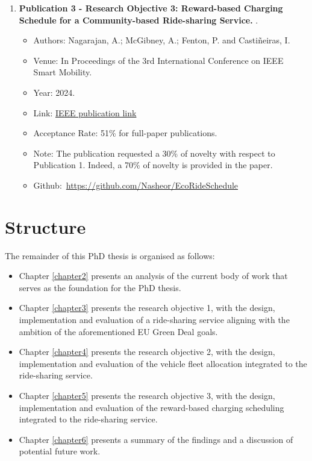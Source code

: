 \begin{enumerate}
    \item \textbf{Publication 3 - Research Objective 3:
    Reward-based Charging Schedule for a Community-based Ride-sharing Service.} \cite{rewardcharging}.
         \begin{itemize}
             \item Authors: Nagarajan, A.; McGibney, A.; Fenton, P. and Castiñeiras, I.
             \item Venue: In Proceedings of the 3rd International Conference on IEEE Smart Mobility.
             \item Year: 2024.
             \item Link: \href{https://ieeexplore.ieee.org/document/10733393}{IEEE publication link}
             \item Acceptance Rate: 51\% for full-paper publications.
             \item Note: The publication requested a 30\% of novelty with respect to Publication 1. Indeed, a 70\% of novelty is provided in the paper.
             \item Github:\ \url{https://github.com/Nasheor/EcoRideSchedule}   
         \end{itemize}
\end{enumerate} 

\section{Structure}
\label{structure}
The remainder of this PhD thesis is organised as follows:
\begin{itemize}
    \item Chapter \ref{chapter2} presents an analysis of the current body of work that serves as the foundation for the PhD thesis.

    \item Chapter \ref{chapter3} presents the research objective 1, with the design, implementation and evaluation of a ride-sharing service aligning with the ambition of the aforementioned EU Green Deal goals.

    \item Chapter \ref{chapter4} presents the research objective 2, with the design, implementation and evaluation of the vehicle fleet allocation integrated to the ride-sharing service.

    \item Chapter \ref{chapter5} presents the research objective 3, with the design, implementation and evaluation of the reward-based charging scheduling integrated to the ride-sharing service.

    \item Chapter \ref{chapter6} presents a summary of the findings and a discussion of potential future work.
\end{itemize}
